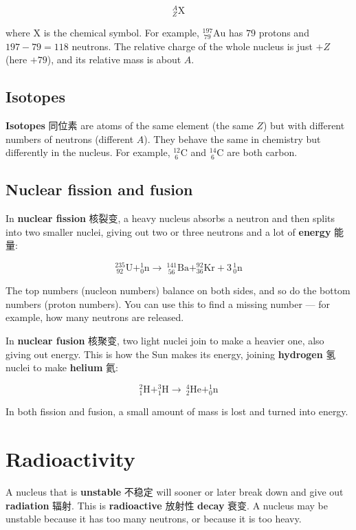 \documentclass[11pt]{article}
\begin{document}
\[
^{A}_{Z}\text{X}
\]

where X is the chemical symbol. For example, $^{197}_{\ 79}\text{Au}$ has $79$ protons and $197 - 79 = 118$ neutrons. The relative charge of the whole nucleus is just $+Z$ (here $+79$), and its relative mass is about $A$.

\subsection*{Isotopes}

\textbf{Isotopes} 同位素 are atoms of the same element (the same $Z$) but with different numbers of neutrons (different $A$). They behave the same in chemistry but differently in the nucleus. For example, $^{12}_{\ 6}\text{C}$ and $^{14}_{\ 6}\text{C}$ are both carbon.

\subsection*{Nuclear fission and fusion}

In \textbf{nuclear fission} 核裂变, a heavy nucleus absorbs a neutron and then splits into two smaller nuclei, giving out two or three neutrons and a lot of \textbf{energy} 能量:

\[
^{235}_{\ 92}\text{U} + ^{1}_{0}\text{n} \rightarrow\ ^{141}_{\ 56}\text{Ba} + ^{92}_{36}\text{Kr} + 3\,^{1}_{0}\text{n}
\]

The top numbers (nucleon numbers) balance on both sides, and so do the bottom numbers (proton numbers). You can use this to find a missing number — for example, how many neutrons are released.

In \textbf{nuclear fusion} 核聚变, two light nuclei join to make a heavier one, also giving out energy. This is how the Sun makes its energy, joining \textbf{hydrogen} 氢 nuclei to make \textbf{helium} 氦:

\[
^{2}_{1}\text{H} + ^{3}_{1}\text{H} \rightarrow\ ^{4}_{2}\text{He} + ^{1}_{0}\text{n}
\]

In both fission and fusion, a small amount of mass is lost and turned into energy.

\section*{Radioactivity}

A nucleus that is \textbf{unstable} 不稳定 will sooner or later break down and give out \textbf{radiation} 辐射. This is \textbf{radioactive} 放射性 \textbf{decay} 衰变. A nucleus may be unstable because it has too many neutrons, or because it is too heavy.
\end{document}
